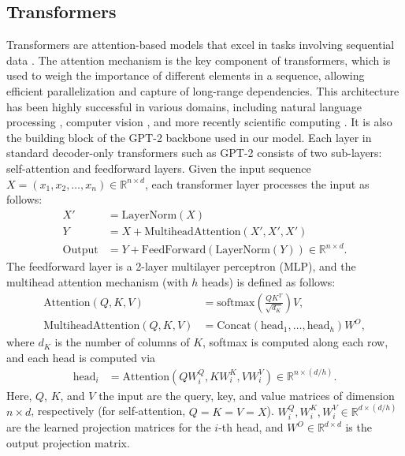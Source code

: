 \documentclass{article}
\begin{document}
\subsection{Transformers}
Transformers are attention-based models that excel in tasks involving sequential data \cite{vaswani2017attention}. The attention mechanism \cite{bahdanau2014neural} is the key component of transformers, which is used to weigh the importance of different elements in a sequence, allowing efficient parallelization and capture of long-range dependencies. This architecture has been highly successful in various domains, including natural language processing \cite{radford2019language}, computer vision \cite{dosovitskiy2020image}, and more recently scientific computing \cite{cao2021choose,yang2023context,liu2024prose}. It is also the building block of the GPT-2 backbone used in our model. 
Each layer in standard decoder-only transformers such as GPT-2 consists of two sub-layers: self-attention and feedforward layers. Given the input sequence $X = (x_1,x_2,\dots,x_n)\in \mathbb{R}^{n\times d}$, each transformer layer processes the input as follows:
\begin{align}
    X' &= \text{LayerNorm}(X)\\
    Y &= X + \text{MultiheadAttention}(X',X',X')\\
    \text{Output} &= Y + \text{FeedForward}(\text{LayerNorm}(Y))\in \mathbb{R}^{n\times d}.
\end{align}
The feedforward layer is a 2-layer multilayer perceptron (MLP), and the multihead attention mechanism (with $h$ heads) is defined as follows:
\begin{align}
    \text{Attention}(Q, K, V) &= \text{softmax}\left(\frac{QK^T}{\sqrt{d_K}}\right)V, \\
    \text{MultiheadAttention}(Q, K, V) &= \text{Concat}(\text{head}_1, \ldots, \text{head}_h)W^O,
\end{align}
where $d_K$ is the number of columns of $K$, softmax is computed along each row, and each head is computed via
\begin{align}
    \text{head}_i &= \text{Attention}(QW_i^Q, KW_i^K, VW_i^V)\in \mathbb{R}^{n\times (d/h)}.
\end{align}
Here, \(Q\), \(K\), and \(V\) the input are the query, key, and value matrices of dimension $n\times d$, respectively (for self-attention, $Q=K=V=X$). \(W_i^Q,W_i^K,W_i^V\in \mathbb{R}^{d\times(d/h)}\) are the learned projection matrices for the \(i\)-th head, and \(W^O\in \mathbb{R}^{d\times d}\) is the output projection matrix. 
\end{document}

